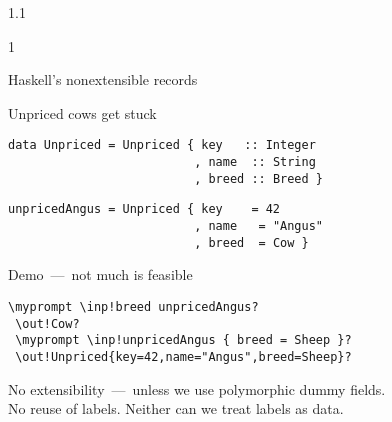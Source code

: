 \documentclass{slides}
\newenvironment{myslide}{\begin{slide}\color{Blue}\begin{boxedminipage}{1.1\hsize}\begin{boxedminipage}{1\hsize}\color{Black}
\vspace{-170\in}
}{%
\smallskip
\end{boxedminipage}
\end{boxedminipage}
\end{slide}}
\newenvironment{myslide}{\begin{slide}
}{%
\end{slide}}
\newenvironment{myslide}{\begin{slide}\color{White}\begin{boxedminipage}{1.1\hsize}\color{Black}
\vspace{-170\in}
}{%
\smallskip
\end{boxedminipage}
\end{slide}}
\newcommand{\header}[1]{{\large \color{Red} #1}}
\newcommand{\inp}[1]{{\color{Brown} \mytextbf{#1}}}
\newcommand{\out}[1]{{\color{Black} \mytextbf{#1}}}
\newcommand{\blau}[1]{{\vspace{-50\in}\normalsize \color{Blue} #1}}
\newcommand{\myprompt}{ghci\ensuremath{>}}
\newcommand{\mytextbf}[1]{\texttt{\textbf{#1}}}
\begin{document}
\begin{myslide}

\header{Haskell's nonextensible records}

\vspace{-66\in}

\blau{Unpriced cows get stuck}

\medskip

\begin{Verbatim}[fontfamily=courier,fontsize=\tiny,commandchars=\\\!\?]
 data Unpriced = Unpriced { key   :: Integer
                          , name  :: String
                          , breed :: Breed }
\end{Verbatim}

\smallskip

\begin{Verbatim}[fontfamily=courier,fontsize=\tiny,commandchars=\\\!\?]
 unpricedAngus = Unpriced { key    = 42
                          , name   = "Angus"
                          , breed  = Cow }
\end{Verbatim}

\vspace{-66\in}

\blau{Demo~---~not much is feasible}

\smallskip

\begin{Verbatim}[fontfamily=courier,fontsize=\small,commandchars=\\\!\?]
 \myprompt \inp!breed unpricedAngus?
 \out!Cow?
 \myprompt \inp!unpricedAngus { breed = Sheep }?
 \out!Unpriced{key=42,name="Angus",breed=Sheep}?
\end{Verbatim}

{\small

No extensibility~---~unless we use polymorphic dummy fields.\\
No reuse of labels. Neither can we treat labels as data.

}

\end{myslide}



\end{document}
